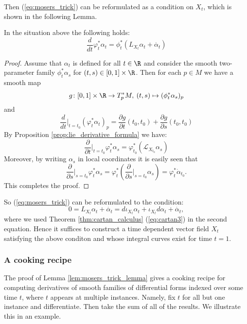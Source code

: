 Then (\ref{eq:mosers_trick}) can be reformulated as a condition on $X_t$, which is shown in the following Lemma.

\begin{lemma}
    \label{lem:mosers_trick_lemma}
    In the situation above the following holds:
    \[
    \frac{d}{dt} \varphi_t^\ast \alpha_t = \phi_t^\ast(L_{X_t}\alpha_t + \dot{\alpha_t})
    \]
\end{lemma}

\begin{proof}
    Assume that $\alpha_t$ is defined for all $t \in \R$ and consider the smooth two-parameter family $\phi_t^\ast \alpha_s$ for $(t,s) \in [0,1] \times \R$. Then for each $p \in M$ we have a smooth map
    \[
        g \colon [0,1] \times \R \to T_p^\ast M, \: (t,s) \mapsto (\phi_t^\ast \alpha_s)_p
    \]
    and
    \[
        \frac{d}{dt}\bigg|_{t=t_0} (\varphi_t^\ast \alpha_t)_p = \frac{\partial g}{\partial t}(t_0,t_0) + \frac{\partial g}{\partial s}(t_0,t_0) 
    \]
    By Proposition \ref{prop:lie_derivative_formula} we have:
    \[
    \frac{\partial}{\partial t}\bigg|_{t=t_0} \varphi_t^\ast \alpha_s = \varphi_{t_0}^\ast(\mathcal{L}_{X_{t_0}} \alpha_s)
    \]
    Moreover, by writing $\alpha_s$ in local coordinates it is easily seen that
    \[
        \frac{\partial}{\partial s}\bigg|_{s=t_0} \varphi_t^\ast \alpha_s = \varphi_t^\ast \left(\frac{\partial}{\partial s}\bigg|_{s=t_0}  \alpha_s \right) = \varphi_t^\ast \dot{\alpha}_{t_0}.
    \]
    This completes the proof.
\end{proof}
So (\ref{eq:mosers_trick}) can be reformulated to the condition:
\[
    0 = L_{X_t}\alpha_t + \dot{\alpha_t} = d\iota_{X_t}\alpha_t + \iota_{X_t}d\alpha_t + \dot{\alpha_t},
\]
where we used Theorem \ref{thm:cartan_calculus} (\ref{eq:cartan3}) in the second equation. Hence it suffices to construct a time dependent vector field $X_t$ satisfying the above conditon and whose integral curves exist for time $t = 1$. 

\subsubsection{A cooking recipe}

The proof of Lemma \ref{lem:mosers_trick_lemma} gives a cooking recipe for computing derivatives of smooth families of differential forms indexed over some time $t$, where $t$ appears at multiple instances. Namely, fix $t$ for all but one instance and differentiate. Then take the sum of all of the results. We illustrate this in an example.

